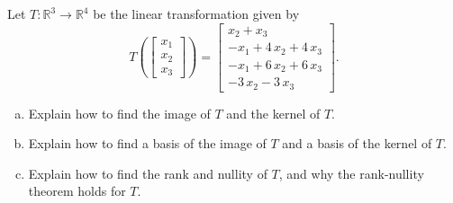 
\begin{exerciseStatement}
 Let \(T:\mathbb{R}^ 3  \to \mathbb{R}^ 4 \) be the linear transformation given by \[T\left(  \left[\begin{array}{c}
x_{1} \\
x_{2} \\
x_{3}
\end{array}\right]  \right) =  \left[\begin{array}{c}
x_{2} + x_{3} \\
-x_{1} + 4 \, x_{2} + 4 \, x_{3} \\
-x_{1} + 6 \, x_{2} + 6 \, x_{3} \\
-3 \, x_{2} - 3 \, x_{3}
\end{array}\right] .\]
\begin{enumerate}[(a)]
\item Explain how to find the image of \(T\) and the kernel of \(T\).
\item Explain how to find a basis of the image of \(T\) and a basis of the kernel of \(T\).
\item Explain how to find the rank and nullity of \(T\), and why the rank-nullity theorem holds for \(T\).
\end{enumerate}
    
\end{exerciseStatement}
    
